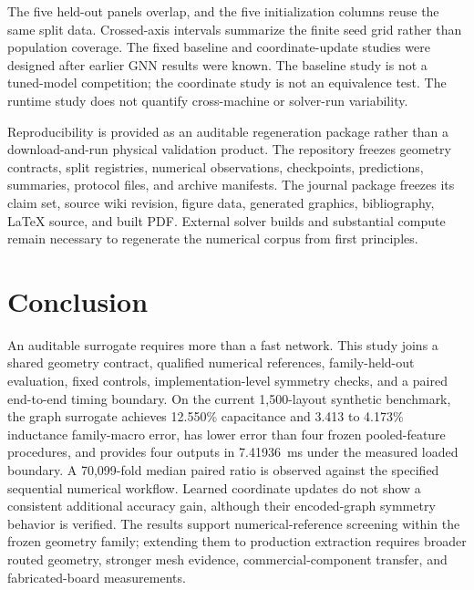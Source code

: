 \documentclass[journal]{IEEEtran}
\begin{document}
The five held-out panels overlap, and the five initialization columns reuse the same split data. Crossed-axis intervals summarize the finite seed grid rather than population coverage. The fixed baseline and coordinate-update studies were designed after earlier GNN results were known. The baseline study is not a tuned-model competition; the coordinate study is not an equivalence test. The runtime study does not quantify cross-machine or solver-run variability.

Reproducibility is provided as an auditable regeneration package rather than a download-and-run physical validation product. The repository freezes geometry contracts, split registries, numerical observations, checkpoints, predictions, summaries, protocol files, and archive manifests. The journal package freezes its claim set, source wiki revision, figure data, generated graphics, bibliography, LaTeX source, and built PDF. External solver builds and substantial compute remain necessary to regenerate the numerical corpus from first principles.

\section{Conclusion}
An auditable surrogate requires more than a fast network. This study joins a shared geometry contract, qualified numerical references, family-held-out evaluation, fixed controls, implementation-level symmetry checks, and a paired end-to-end timing boundary. On the current 1,500-layout synthetic benchmark, the graph surrogate achieves 12.550\% capacitance and 3.413 to 4.173\% inductance family-macro error, has lower error than four frozen pooled-feature procedures, and provides four outputs in 7.41936~ms under the measured loaded boundary. A 70,099-fold median paired ratio is observed against the specified sequential numerical workflow. Learned coordinate updates do not show a consistent additional accuracy gain, although their encoded-graph symmetry behavior is verified. The results support numerical-reference screening within the frozen geometry family; extending them to production extraction requires broader routed geometry, stronger mesh evidence, commercial-component transfer, and fabricated-board measurements.

\appendices
\end{document}
